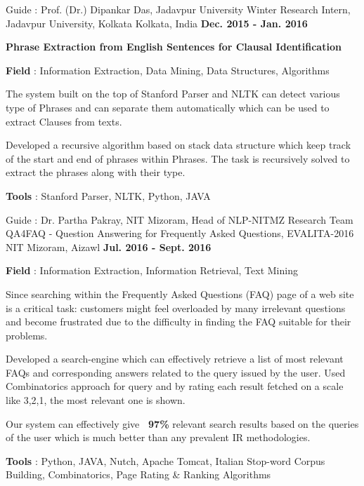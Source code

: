 \begin{cventries}
  \cventry
    {Guide : Prof. (Dr.) Dipankar Das, Jadavpur University}
    {Winter Research Intern, Jadavpur University, Kolkata}
    {Kolkata, India}
    {\textbf{Dec. 2015 - Jan. 2016}}
    {
      \begin{cvitems}
        \item\textbf {Phrase Extraction from English Sentences for Clausal Identification}
        \item{\textbf{Field} : Information Extraction, Data Mining, Data Structures, Algorithms}
        \item{The system built on the top of Stanford Parser and NLTK can detect various type of Phrases and
 can separate them automatically which can be used to extract Clauses from texts.}
        \item{Developed a recursive algorithm
 based on stack data structure which keep track of the start and end of phrases within Phrases. The task
 is recursively solved to extract the phrases along with their type.}
        \item {\textbf{Tools} : Stanford Parser, NLTK, Python, JAVA}
      \end{cvitems}
    }
          \cventry
    {Guide : Dr. Partha Pakray, NIT Mizoram, Head of NLP-NITMZ Research Team}
    {QA4FAQ - Question Answering for Frequently Asked Questions, EVALITA-2016}
    {NIT Mizoram, Aizawl}
    {\textbf{Jul. 2016 - Sept. 2016}}
    {
      \begin{cvitems}
        \item{\textbf{Field} : Information Extraction, Information Retrieval, Text Mining}
        \item{Since searching within the Frequently Asked Questions (FAQ) page of a web site is a critical task: customers might feel overloaded by many irrelevant questions and become frustrated due to the difficulty in finding the FAQ suitable for their problems.}
        \item{Developed a search-engine which can effectively retrieve a list of most relevant FAQs and corresponding answers related to the query issued by the user. Used Combinatorics approach for query and by rating each result fetched on a scale like 3,2,1, the most relevant one is shown.}
        \item{Our system can effectively give \textbf{~97\%} relevant search results based on the queries of the user which is much better than any prevalent IR methodologies.}
        \item{\textbf{Tools} : Python, JAVA, Nutch, Apache Tomcat, Italian Stop-word Corpus Building, Combinatorics, Page Rating \& Ranking Algorithms}

\end{cvitems}}
\end{cventries}
